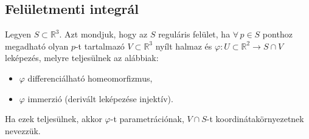 \documentclass[main.tex]{subfiles}
\begin{document}
\subsection{Felületmenti integrál}


Legyen $S \subset  \mathbb{R}^3$. Azt mondjuk, hogy az $S$
reguláris felület, ha $\forall \, p \in S$ ponthoz megadható
olyan $p$-t tartalmazó $V \subset \mathbb{R}^3$ nyílt halmaz
és $\varphi: U \subset \mathbb{R}^2 \rightarrow S \cap V$
leképezés, melyre teljesülnek az alábbiak:
\begin{itemize}
  \item $\varphi$ differenciálható homeomorfizmus,

  \item $\varphi$ immerzió (derivált leképezése injektív).
\end{itemize}
Ha ezek teljesülnek, akkor $\varphi$-t parametrációnak,
$V \cap S$-t  koordinátakörnyezetnek nevezzük.
\end{document}
